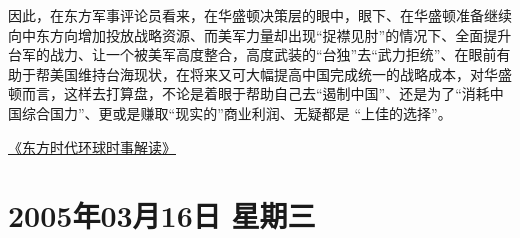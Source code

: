 \documentclass[a4paper,11pt]{article}
\begin{document}
\begin{itemize}
\begin{itemize}
    因此，在东方军事评论员看来，在华盛顿决策层的眼中，眼下、在华盛顿准备继续向中东方向增加投放战略资源、而美军力量却出现“捉襟见肘”的情况下、全面提升台军的战力、让一个被美军高度整合，高度武装的“台独”去“武力拒统”、在眼前有助于帮美国维持台海现状，在将来又可大幅提高中国完成统一的战略成本，对华盛顿而言，这样去打算盘，不论是着眼于帮助自己去“遏制中国”、还是为了“消耗中国综合国力”、更或是赚取“现实的”商业利润、无疑都是 “上佳的选择”。

    \href{http://www.dongfangtime.com}{《东方时代环球时事解读》}





\end{itemize} %
\end{itemize} %
\section{2005年03月16日 星期三}
\label{sec-4}
\end{document}
